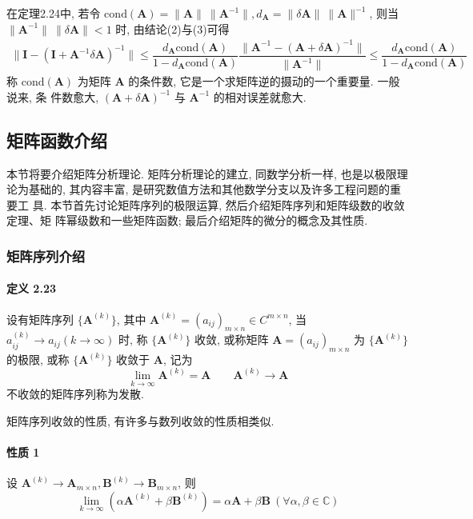 \par 在定理2.24中, 若令 $\mathrm{cond}(\bm{A}) = \lVert \bm{A} \rVert \ \lVert \bm{A}^{-1} \rVert, d_{\bm{A}} = \lVert \delta \bm{A} \rVert \ \lVert \bm{A} \rVert ^{-1}$, 则当 $\lVert \bm{A}^{-1} \rVert \ \lVert \delta \bm{A} \rVert < 1$
时, 由结论(2)与(3)可得
\begin{gather*}
    \lVert \bm{I} - (\bm{I} + \bm{A}^{-1}\delta\bm{A})^{-1} \rVert \leqslant \dfrac{d_{\bm{A}}\mathrm{cond}(\bm{A})}{1 - d_{\bm{A}}\mathrm{cond}(\bm{A})}
    \dfrac{\lVert \bm{A}^{-1} - (\bm{A} + \delta\bm{A})^{-1} \rVert}{\lVert \bm{A}^{-1} \rVert} \leqslant \dfrac{d_{\bm{A}}\mathrm{cond}(\bm{A})}{1 - d_{\bm{A}}\mathrm{cond}(\bm{A})}
\end{gather*}
称 $\mathrm{cond}(\bm{A})$ 为矩阵 $\bm{A}$ 的条件数, 它是一个求矩阵逆的摄动的一个重要量. 一般说来, 条
件数愈大, $(\bm{A} + \delta\bm{A})^{-1}$ 与 $\bm{A}^{-1}$ 的相对误差就愈大.

\subsection{矩阵函数介绍}

本节将要介绍矩阵分析理论. 矩阵分析理论的建立, 同数学分析一样, 也是以极限理
论为基础的, 其内容丰富, 是研究数值方法和其他数学分支以及许多工程问题的重要工
具. 本节首先讨论矩阵序列的极限运算, 然后介绍矩阵序列和矩阵级数的收敛定理、矩
阵幂级数和一些矩阵函数; 最后介绍矩阵的微分的概念及其性质.

\subsubsection{矩阵序列介绍}

\paragraph*{定义 2.23} 设有矩阵序列 $\{\bm{A}^{(k)}\}$, 其中 $\bm{A}^{(k)} = (a_{ij})_{m\times n} \in C^{m\times n}$, 当 $a_{ij}^{(k)} \to a_{ij} (k \to \infty)$ 时, 称 $\{\bm{A}^{(k)}\}$ 收敛, 或称矩阵 $\bm{A} = (a_{ij})_{m\times n}$ 为 $\{\bm{A}^{(k)}\}$ 的极限, 或称 $\{\bm{A}^{(k)}\}$ 收敛于 $\bm{A}$, 记为
$$
    \lim_{k\to \infty} \bm{A}^{(k)} = \bm{A} \qquad \bm{A}^{(k)} \to \bm{A}
$$
不收敛的矩阵序列称为发散.

\par 矩阵序列收敛的性质, 有许多与数列收敛的性质相类似.

\paragraph*{性质 1} 设 $\bm{A}^{(k)} \to \bm{A}_{m\times n}, \bm{B}^{(k)} \to \bm{B}_{m\times n}$, 则
$$
    \lim_{k \to \infty} (\alpha \bm{A}^{(k)} + \beta \bm{B}^{(k)}) = \alpha\bm{A} + \beta\bm{B} \ (\forall \alpha, \beta \in \mathbb{C})
$$

